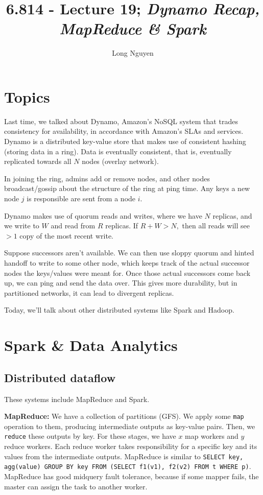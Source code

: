 \documentclass{article}
\title{6.814 - Lecture 19; \emph{Dynamo Recap, MapReduce \& Spark}}
\author{Long Nguyen}
\begin{document}
\maketitle


\section{Topics}

Last time, we talked about Dynamo, Amazon's NoSQL system that trades consistency for availability, in accordance with Amazon's SLAs and services. Dynamo is a distributed key-value store that makes use of consistent hashing (storing data in a ring). Data is eventually consistent, that is, eventually replicated towards all $N$ nodes (overlay network).

In joining the ring, admins add or remove nodes, and other nodes broadcast/gossip about the structure of the ring at ping time. Any keys a new node $j$ is responsible are sent from a node $i$.

Dynamo makes use of quorum reads and writes, where we have $N$ replicas, and we write to $W$ and read from $R$ replicas. If $R+W>N,$ then all reads will see $>1$ copy of the most recent write.

Suppose successors aren't available. We can then use sloppy quorum and hinted handoff to write to some other node, which keeps track of the actual successor nodes the keys/values were meant for. Once those actual successors come back up, we can ping and send the data over. This gives more durability, but in partitioned networks, it can lead to divergent replicas.

Today, we'll talk about other distributed systems like Spark and Hadoop.

\section{Spark \& Data Analytics}

\subsection{Distributed dataflow} These systems include MapReduce and Spark.

\textbf{MapReduce:} We have a collection of partitions (GFS). We apply some \verb|map| operation to them, producing intermediate outputs as key-value pairs. Then, we \verb|reduce| these outputs by key. For these stages, we have $x$ map workers and $y$ reduce workers. Each reduce worker takes responsibility for a specific key and its values from the intermediate outputs. MapReduce is similar to \verb|SELECT key, agg(value) GROUP BY key FROM (SELECT f1(v1), f2(v2) FROM t WHERE p)|. MapReduce has good midquery fault tolerance, because if some mapper fails, the master can assign the task to another worker.
\end{document}
